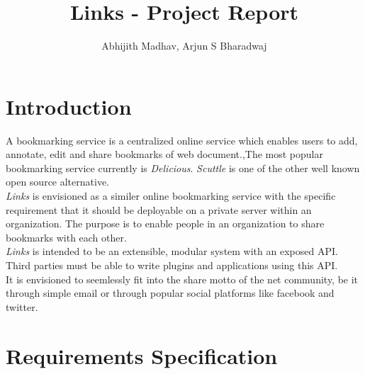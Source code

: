 \documentclass[11pt]{report} %
\title{Links - Project Report}
\author{Abhijith Madhav, Arjun S Bharadwaj}
\begin{document}
\maketitle

\tableofcontents
\chapter{Introduction}

A bookmarking service is a centralized online service which enables users to add, annotate, edit and share bookmarks of web document.,The most popular bookmarking service currently is \emph{Delicious}. \emph{Scuttle} is one of the other well known open source alternative. 
 \\

\noindent
\emph {Links} is envisioned as a similer online bookmarking service with the specific requirement that it should be deployable on a private server within an organization. The purpose is to enable people in an organization to share bookmarks with each other.
 \\

\noindent
\emph {Links} is intended to be an extensible, modular system with an exposed API. Third parties must be able to write plugins and applications using this API.
 \\

\noindent
It is envisioned to seemlessly fit into the share motto of the net community, be it through simple email or through popular social platforms like facebook and twitter.



\chapter{Requirements Specification}
\end{document}
